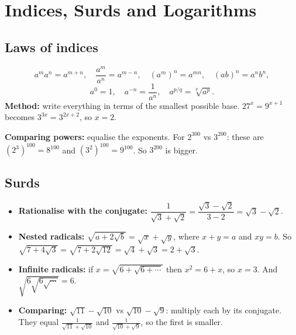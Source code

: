 \documentclass[11pt,a4paper,openany]{report}
\begin{document}
\chapter{Indices, Surds and Logarithms}\label{ch:log}

\section{Laws of indices}
\[a^ma^n=a^{m+n},\quad\frac{a^m}{a^n}=a^{m-n},\quad(a^m)^n=a^{mn},\quad(ab)^n=a^nb^n,\]
\[a^0=1,\quad a^{-n}=\frac1{a^n},\quad a^{p/q}=\sqrt[q]{a^p}.\]
\textbf{Method:} write everything in terms of the smallest possible base. $27^x=9^{x+1}$ becomes $3^{3x}=3^{2x+2}$, so $x=2$.

\textbf{Comparing powers:} equalise the exponents. For $2^{300}$ vs $3^{200}$: these are $(2^3)^{100}=8^{100}$ and $(3^2)^{100}=9^{100}$. So $3^{200}$ is bigger.

\section{Surds}
\begin{itemize}
\item \textbf{Rationalise with the conjugate:} $\dfrac1{\sqrt3+\sqrt2}=\dfrac{\sqrt3-\sqrt2}{3-2}=\sqrt3-\sqrt2$.
\item \textbf{Nested radicals:} $\sqrt{a+2\sqrt b}=\sqrt x+\sqrt y$, where $x+y=a$ and $xy=b$. So $\sqrt{7+4\sqrt3}=\sqrt{7+2\sqrt{12}}=\sqrt4+\sqrt3=2+\sqrt3$.
\item \textbf{Infinite radicals:} if $x=\sqrt{6+\sqrt{6+\cdots}}$ then $x^2=6+x$, so $x=3$. And $\sqrt{6\sqrt{6\sqrt{\cdots}}}=6$.
\item \textbf{Comparing:} $\sqrt{11}-\sqrt{10}$ vs $\sqrt{10}-\sqrt9$: multiply each by its conjugate. They equal $\frac1{\sqrt{11}+\sqrt{10}}$ and $\frac1{\sqrt{10}+\sqrt9}$, so the first is smaller.
\end{itemize}
\end{document}
